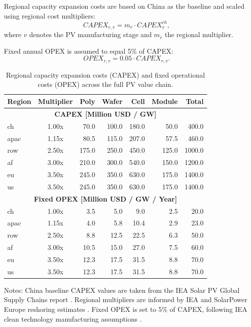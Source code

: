 \documentclass[11pt,a4paper]{article}
\begin{document}
Regional capacity expansion costs are based on China as the baseline and scaled using regional cost multipliers:
\begin{equation}
CAPEX_{r,v} = m_r \cdot CAPEX^{ch}_{v},
\end{equation}
where $v$ denotes the PV manufacturing stage and $m_r$ the regional multiplier.

Fixed annual OPEX is assumed to equal 5\% of CAPEX:
\begin{equation}
OPEX_{r,v} = 0.05 \cdot CAPEX_{r,v}.
\end{equation}

\begin{table}[htbp]
\centering
\caption{Regional capacity expansion costs (CAPEX) and fixed operational costs (OPEX) across the full PV value chain.}
\label{tab:capex_opex_full_chain}
\begin{tabular}{l c r r r r r}
\toprule
\textbf{Region} & \textbf{Multiplier} & \textbf{Poly} & \textbf{Wafer} & \textbf{Cell} & \textbf{Module} & \textbf{Total} \\
\midrule
\multicolumn{7}{c}{\textbf{CAPEX [Million USD / GW]}} \\
\midrule
ch   & 1.00x & 70.0  & 100.0 & 180.0 & 50.0  & 400.0 \\
apac & 1.15x & 80.5  & 115.0 & 207.0 & 57.5  & 460.0 \\
row  & 2.50x & 175.0 & 250.0 & 450.0 & 125.0 & 1000.0 \\
af   & 3.00x & 210.0 & 300.0 & 540.0 & 150.0 & 1200.0 \\
eu   & 3.50x & 245.0 & 350.0 & 630.0 & 175.0 & 1400.0 \\
us   & 3.50x & 245.0 & 350.0 & 630.0 & 175.0 & 1400.0 \\
\midrule
\multicolumn{7}{c}{\textbf{Fixed OPEX [Million USD / GW / Year]}} \\
\midrule
ch   & 1.00x & 3.5  & 5.0  & 9.0  & 2.5  & 20.0 \\
apac & 1.15x & 4.0  & 5.8  & 10.4 & 2.9  & 23.0 \\
row  & 2.50x & 8.8  & 12.5 & 22.5 & 6.3  & 50.0 \\
af   & 3.00x & 10.5 & 15.0 & 27.0 & 7.5  & 60.0 \\
eu   & 3.50x & 12.3 & 17.5 & 31.5 & 8.8  & 70.0 \\
us   & 3.50x & 12.3 & 17.5 & 31.5 & 8.8  & 70.0 \\
\bottomrule
\end{tabular}

\vspace{0.6em}
\footnotesize
Notes: China baseline CAPEX values are taken from the IEA Solar PV Global Supply Chains report \cite{iea_solar_supply_2022}. Regional multipliers are informed by IEA and SolarPower Europe reshoring estimates \cite{spe_reshoring_2024}. Fixed OPEX is set to 5\% of CAPEX, following IEA clean technology manufacturing assumptions \cite{iea_cleantech_2023}.
\end{table}
\end{document}
